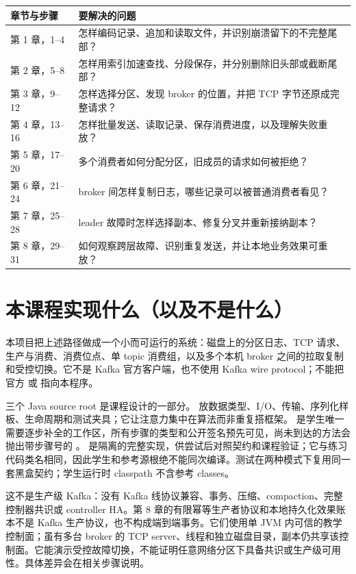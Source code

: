\begin{center}
\small
\begin{tabular}{p{}p{}}
\toprule
章节与步骤 & 要解决的问题 \\
\midrule
第 1 章，1--4 & 怎样编码记录、追加和读取文件，并识别崩溃留下的不完整尾部？\\
第 2 章，5--8 & 怎样用索引加速查找、分段保存，并分别删除旧头部或截断尾部？\\
第 3 章，9--12 & 怎样选择分区、发现 broker 的位置，并把 TCP 字节还原成完整请求？\\
第 4 章，13--16 & 怎样批量发送、读取记录、保存消费进度，以及理解失败重放？\\
第 5 章，17--20 & 多个消费者如何分配分区，旧成员的请求如何被拒绝？\\
第 6 章，21--24 & broker 间怎样复制日志，哪些记录可以被普通消费者看见？\\
第 7 章，25--28 & leader 故障时怎样选择副本、修复分叉并重新接纳副本？\\
第 8 章，29--31 & 如何观察跨层故障、识别重复发送，并让本地业务效果可重放？\\
\bottomrule
\end{tabular}
\end{center}

\section{本课程实现什么（以及不是什么）}
本项目把上述路径做成一个小而可运行的系统：磁盘上的分区日志、TCP 请求、生产与消费、消费位点、单 topic 消费组，以及多个本机 broker 之间的拉取复制和受控切换。它不是 Kafka 官方客户端，也不使用 Kafka wire protocol；不能把官方  或  指向本程序。

三个 Java source root 是课程设计的一部分。 放数据类型、I/O、传输、序列化样板、生命周期和测试夹具；它让注意力集中在算法而非重复搭框架。 是学生唯一需要逐步补全的工作区，所有步骤的类型和公开签名预先可见，尚未到达的方法会抛出带步骤号的 。 是隔离的完整实现，供尝试后对照契约和课程验证；它与练习代码类名相同，因此学生和参考源根绝不能同次编译。测试在两种模式下复用同一套黑盒契约；学生运行时 classpath 不含参考 classes。

这不是生产级 Kafka：没有 Kafka 线协议兼容、事务、压缩、compaction、完整控制器共识或 controller HA。第 8 章的有限幂等生产者协议和本地持久化效果账本不是 Kafka 生产协议，也不构成端到端事务。它们使用单 JVM 内可信的教学控制面；虽有多台 broker 的 TCP server、线程和独立磁盘目录，副本仍共享该控制面。它能演示受控故障切换，不能证明任意网络分区下具备共识或生产级可用性。具体差异会在相关步骤说明。

